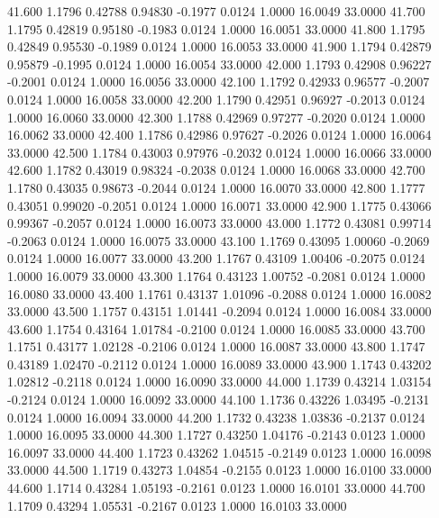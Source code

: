   41.600   1.1796   0.42788   0.94830  -0.1977   0.0124   1.0000  16.0049  33.0000
  41.700   1.1795   0.42819   0.95180  -0.1983   0.0124   1.0000  16.0051  33.0000
  41.800   1.1795   0.42849   0.95530  -0.1989   0.0124   1.0000  16.0053  33.0000
  41.900   1.1794   0.42879   0.95879  -0.1995   0.0124   1.0000  16.0054  33.0000
  42.000   1.1793   0.42908   0.96227  -0.2001   0.0124   1.0000  16.0056  33.0000
  42.100   1.1792   0.42933   0.96577  -0.2007   0.0124   1.0000  16.0058  33.0000
  42.200   1.1790   0.42951   0.96927  -0.2013   0.0124   1.0000  16.0060  33.0000
  42.300   1.1788   0.42969   0.97277  -0.2020   0.0124   1.0000  16.0062  33.0000
  42.400   1.1786   0.42986   0.97627  -0.2026   0.0124   1.0000  16.0064  33.0000
  42.500   1.1784   0.43003   0.97976  -0.2032   0.0124   1.0000  16.0066  33.0000
  42.600   1.1782   0.43019   0.98324  -0.2038   0.0124   1.0000  16.0068  33.0000
  42.700   1.1780   0.43035   0.98673  -0.2044   0.0124   1.0000  16.0070  33.0000
  42.800   1.1777   0.43051   0.99020  -0.2051   0.0124   1.0000  16.0071  33.0000
  42.900   1.1775   0.43066   0.99367  -0.2057   0.0124   1.0000  16.0073  33.0000
  43.000   1.1772   0.43081   0.99714  -0.2063   0.0124   1.0000  16.0075  33.0000
  43.100   1.1769   0.43095   1.00060  -0.2069   0.0124   1.0000  16.0077  33.0000
  43.200   1.1767   0.43109   1.00406  -0.2075   0.0124   1.0000  16.0079  33.0000
  43.300   1.1764   0.43123   1.00752  -0.2081   0.0124   1.0000  16.0080  33.0000
  43.400   1.1761   0.43137   1.01096  -0.2088   0.0124   1.0000  16.0082  33.0000
  43.500   1.1757   0.43151   1.01441  -0.2094   0.0124   1.0000  16.0084  33.0000
  43.600   1.1754   0.43164   1.01784  -0.2100   0.0124   1.0000  16.0085  33.0000
  43.700   1.1751   0.43177   1.02128  -0.2106   0.0124   1.0000  16.0087  33.0000
  43.800   1.1747   0.43189   1.02470  -0.2112   0.0124   1.0000  16.0089  33.0000
  43.900   1.1743   0.43202   1.02812  -0.2118   0.0124   1.0000  16.0090  33.0000
  44.000   1.1739   0.43214   1.03154  -0.2124   0.0124   1.0000  16.0092  33.0000
  44.100   1.1736   0.43226   1.03495  -0.2131   0.0124   1.0000  16.0094  33.0000
  44.200   1.1732   0.43238   1.03836  -0.2137   0.0124   1.0000  16.0095  33.0000
  44.300   1.1727   0.43250   1.04176  -0.2143   0.0123   1.0000  16.0097  33.0000
  44.400   1.1723   0.43262   1.04515  -0.2149   0.0123   1.0000  16.0098  33.0000
  44.500   1.1719   0.43273   1.04854  -0.2155   0.0123   1.0000  16.0100  33.0000
  44.600   1.1714   0.43284   1.05193  -0.2161   0.0123   1.0000  16.0101  33.0000
  44.700   1.1709   0.43294   1.05531  -0.2167   0.0123   1.0000  16.0103  33.0000
